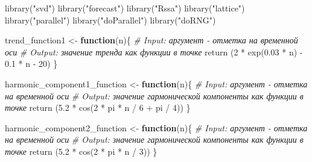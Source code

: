 \documentclass[
]{article}
\author{}
\date{\vspace{-2.5em}}
\newenvironment{Shaded}{\begin{snugshade}}{\end{snugshade}}
\newcommand{\CommentTok}[1]{\textcolor[rgb]{0.56,0.35,0.01}{\textit{#1}}}
\newcommand{\ControlFlowTok}[1]{\textcolor[rgb]{0.13,0.29,0.53}{\textbf{#1}}}
\newcommand{\DecValTok}[1]{\textcolor[rgb]{0.00,0.00,0.81}{#1}}
\newcommand{\FloatTok}[1]{\textcolor[rgb]{0.00,0.00,0.81}{#1}}
\newcommand{\FunctionTok}[1]{\textcolor[rgb]{0.00,0.00,0.00}{#1}}
\newcommand{\NormalTok}[1]{#1}
\newcommand{\OtherTok}[1]{\textcolor[rgb]{0.56,0.35,0.01}{#1}}
\newcommand{\SpecialCharTok}[1]{\textcolor[rgb]{0.00,0.00,0.00}{#1}}
\newcommand{\StringTok}[1]{\textcolor[rgb]{0.31,0.60,0.02}{#1}}
\begin{document}
\begin{Shaded}
\begin{Highlighting}[]
  \FunctionTok{library}\NormalTok{(}\StringTok{"svd"}\NormalTok{)}
  \FunctionTok{library}\NormalTok{(}\StringTok{"forecast"}\NormalTok{)}
  \FunctionTok{library}\NormalTok{(}\StringTok{"Rssa"}\NormalTok{)}
  \FunctionTok{library}\NormalTok{(}\StringTok{"lattice"}\NormalTok{)}
  \FunctionTok{library}\NormalTok{(}\StringTok{"parallel"}\NormalTok{)}
  \FunctionTok{library}\NormalTok{(}\StringTok{"doParallel"}\NormalTok{)}
  \FunctionTok{library}\NormalTok{(}\StringTok{"doRNG"}\NormalTok{)}
\end{Highlighting}
\end{Shaded}

\begin{Shaded}
\begin{Highlighting}[]
\NormalTok{    trend\_function1 }\OtherTok{\textless{}{-}} \ControlFlowTok{function}\NormalTok{(n)\{}
      \CommentTok{\# Input: аргумент {-} отметка на временной оси}
      \CommentTok{\# Output: значение тренда как функции в точке}
      \FunctionTok{return}\NormalTok{ (}\DecValTok{2} \SpecialCharTok{*} \FunctionTok{exp}\NormalTok{(}\FloatTok{0.03} \SpecialCharTok{*}\NormalTok{ n) }\SpecialCharTok{{-}} \FloatTok{0.1} \SpecialCharTok{*}\NormalTok{ n }\SpecialCharTok{{-}} \DecValTok{20}\NormalTok{)}
\NormalTok{    \}}
\end{Highlighting}
\end{Shaded}

\begin{Shaded}
\begin{Highlighting}[]
\NormalTok{    harmonic\_component1\_function }\OtherTok{\textless{}{-}} \ControlFlowTok{function}\NormalTok{(n)\{}
      \CommentTok{\# Input: аргумент {-} отметка на временной оси}
      \CommentTok{\# Output: значение гармонической компоненты как функции в точке}
      \FunctionTok{return}\NormalTok{ (}\FloatTok{5.2} \SpecialCharTok{*} \FunctionTok{cos}\NormalTok{(}\DecValTok{2} \SpecialCharTok{*}\NormalTok{ pi }\SpecialCharTok{*}\NormalTok{ n }\SpecialCharTok{/} \DecValTok{6} \SpecialCharTok{+}\NormalTok{ pi }\SpecialCharTok{/} \DecValTok{4}\NormalTok{))}
\NormalTok{    \}}
\end{Highlighting}
\end{Shaded}

\begin{Shaded}
\begin{Highlighting}[]
\NormalTok{    harmonic\_component2\_function }\OtherTok{\textless{}{-}} \ControlFlowTok{function}\NormalTok{(n)\{}
      \CommentTok{\# Input: аргумент {-} отметка на временной оси}
      \CommentTok{\# Output: значение гармонической компоненты как функции в точке}
      \FunctionTok{return}\NormalTok{ (}\FloatTok{5.2} \SpecialCharTok{*} \FunctionTok{cos}\NormalTok{(}\DecValTok{2} \SpecialCharTok{*}\NormalTok{ pi }\SpecialCharTok{*}\NormalTok{ n }\SpecialCharTok{/} \DecValTok{3}\NormalTok{))}
\NormalTok{    \}}
\end{Highlighting}
\end{Shaded}
\end{document}
